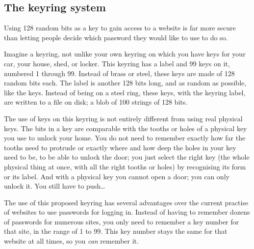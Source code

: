 \subsection{The keyring system}
Using 128 random bits as a key to gain access to a website is far more secure than letting people decide which password they would like to use to do so.
\par
Imagine a keyring, not unlike your own keyring on which you have keys for your car, your house, shed, or locker.
This keyring has a label and 99 keys on it, numbered 1 through 99.
Instead of brass or steel, these keys are made of 128 random bits each.
The label is another 128 bits long, and as random as possible, like the keys.
Instead of being on a steel ring, these keys, with the keyring label, are written to a file on disk; a blob of 100 strings of 128 bits.
\par
The use of keys on this keyring is not entirely different from using real physical keys.
The bits in a key are comparable with the tooths or holes of a physical key you use to unlock your home.
You do not need to remember exactly how far the tooths need to protrude or exactly where and how deep the holes in your key need to be, to be able to unlock the door;
you just select the right key
(the whole physical thing at once, with all the right tooths or holes)
by recognising its form or its label.
And with a physical key you cannot open a door; you can only unlock it.
You still have to push\ldots
\par
The use of this proposed keyring has several advantages over the current practise of websites to use passwords for logging in.
Instead of having to remember dozens of passwords for numerous sites,
you only need to remember a key number for that site, in the range of 1 to 99.
This key number stays the same for that website at all times, so you \emph{can} remember it.
